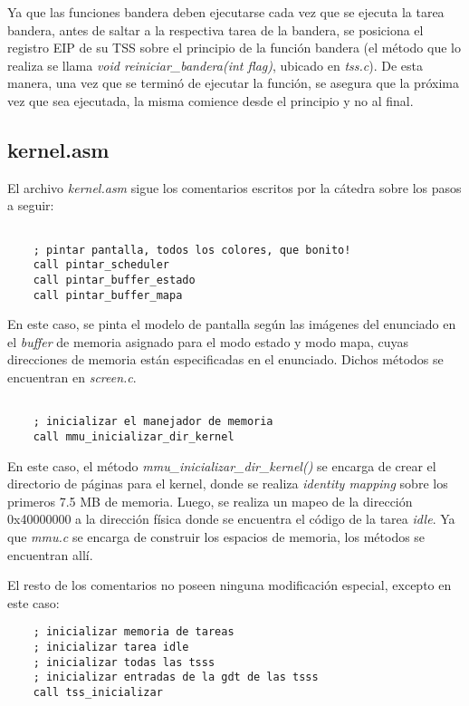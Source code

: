 \documentclass[a4paper]{article}
\newenvironment{codesnippet}{%
	\begin{Sbox}\begin{minipage}{\textwidth}\sffamily\small}%
	{\end{minipage}\end{Sbox}%
		\begin{center}%
		\vspace{-0.4cm}\colorbox{litegrey}{\TheSbox}\end{center}\vspace{0.3cm}}
\begin{document}
Ya que las funciones bandera deben ejecutarse cada vez que se ejecuta la tarea bandera, antes de saltar a la respectiva tarea de la bandera, se posiciona el registro EIP de su TSS sobre el principio de la función bandera (el método que lo realiza se llama \textit{void reiniciar_bandera(int flag)}, ubicado en \textit{tss.c}). De esta manera, una vez que se terminó de ejecutar la función, se asegura que la próxima vez que sea ejecutada, la misma comience desde el principio y no al final.


\subsection{kernel.asm}
El archivo \textit{kernel.asm} sigue los comentarios escritos por la cátedra sobre los pasos a seguir:

\begin{codesnippet}
\begin{verbatim}

    ; pintar pantalla, todos los colores, que bonito!
    call pintar_scheduler
    call pintar_buffer_estado
    call pintar_buffer_mapa

\end{verbatim}
\end{codesnippet}

En este caso, se pinta el modelo de pantalla según las imágenes del enunciado en el \textit{buffer} de memoria asignado para el modo estado y modo mapa, cuyas direcciones de memoria están especificadas en el enunciado. Dichos métodos se encuentran en \textit{screen.c}.

\begin{codesnippet}
\begin{verbatim}

    ; inicializar el manejador de memoria
    call mmu_inicializar_dir_kernel

\end{verbatim}
\end{codesnippet}

En este caso, el método \textit{mmu_inicializar_dir_kernel()} se encarga de crear el directorio de páginas para el kernel, donde se realiza \textit{identity mapping} sobre los primeros 7.5 MB de memoria. Luego, se realiza un mapeo de la dirección 0x40000000 a la dirección física donde se encuentra el código de la tarea \textit{idle}. Ya que \textit{mmu.c} se encarga de construir los espacios de memoria, los métodos se encuentran allí.

El resto de los comentarios no poseen ninguna modificación especial, excepto en este caso:
\begin{codesnippet}
\begin{verbatim}
    ; inicializar memoria de tareas
    ; inicializar tarea idle
    ; inicializar todas las tsss
    ; inicializar entradas de la gdt de las tsss
    call tss_inicializar
\end{verbatim}
\end{codesnippet}
\end{document}
